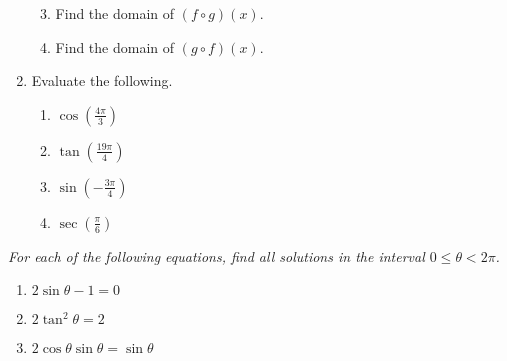\documentclass[11pt]{article}
\begin{document}
\begin{enumerate}
\begin{multicols}{2}
\begin{enumerate}
\setcounter{enumii}{2}
\item Find the domain of $(f \circ g)(x)$.
\item Find the domain of $(g \circ f)(x)$.
\end{enumerate}
\end{multicols}
\vfill

\item Evaluate the following.
\begin{multicols}{4}
\begin{enumerate}
\item $\cos\left( \frac{4\pi}{3} \right)$
\item $\tan\left( \frac{19\pi}{4} \right)$
\item $\sin\left( -\frac{3\pi}{4} \right)$
\item $\sec\left( \frac{\pi}{6} \right)$
\end{enumerate}
\end{multicols}
\setcounter{enumCount}{\theenumi}
\end{enumerate}
\vfill

\noindent
\textit{For each of the following equations, find all solutions in the interval $0 \le \theta < 2\pi$. }
\begin{multicols}{3}
\begin{enumerate}
\setcounter{enumi}{\theenumCount}
\item $2 \sin \theta - 1 = 0$
\item $2 \tan^2 \theta = 2$
\item $2 \cos \theta \sin \theta = \sin \theta$
\setcounter{enumCount}{\theenumi}
\end{enumerate}
\end{multicols}
\vfill
\end{document}
